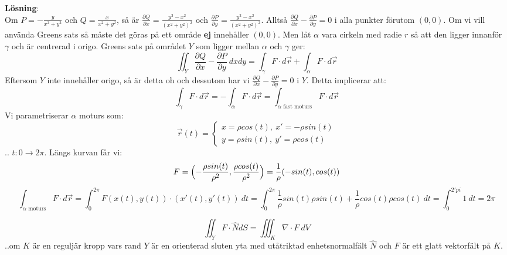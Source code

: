 \documentclass{report}
\begin{document}
\noindent
\textbf{Lösning}:\\
Om $ P = - \frac{y}{x^2+y^2}  $ och $ Q = \frac{x}{x^2+y^2}  $, så är $ \frac{\partial Q }{\partial x } = \frac{y^2-x^2}{( x^2+y^2 )^2}   $ och $ \frac{\partial P }{\partial y }  = \frac{y^2-x^2}{(x^2+y^2)^2}  $. Alltså $ \frac{\partial Q }{\partial x } - \frac{\partial P }{\partial y } = 0 $ i alla punkter förutom $ (0,0) $. Om vi vill använda Greens sats så måste det göras på ett område \textbf{ej} innehåller $ (0,0) $. Men låt $ \alpha $  vara cirkeln med radie $ r $ så att den ligger innanför $ \gamma $ och är centrerad i origo. Greens sats på området $ Y $ som ligger mellan $ \alpha $ och $ \gamma $ ger:
\begin{equation*}
\iint_{Y} \frac{\partial Q }{\partial x } - \frac{\partial P }{\partial y } \: dxdy = \int_{ \gamma}^{} F \cdot  d \vec{r} + \int_{ \alpha}^{} F \cdot d \vec{r}   
\end{equation*}
Eftersom $ Y $ inte innehåller origo, så är detta oh och dessutom har vi $ \frac{\partial Q }{\partial x } - \frac{\partial P }{\partial y } = 0 $ i $ Y $. Detta implicerar att:
\begin{equation*}
\int_{ \gamma}^{} F \cdot  d \vec{r} = - \int_{ \alpha}^{} F \cdot d \vec{r} = \int_{ \alpha \text{ fast moturs} }^{} F \cdot  d \vec{r}   
\end{equation*}
Vi parametriserar $ \alpha $ moturs som:
\begin{equation*}
 \vec{r} (t) = \begin{cases}
	 x = \rho cos(t), \: x' = - \rho sin(t)\\
	 y = \rho sin(t), \: y' = \rho cos(t)
\end{cases}
\end{equation*}
.. $ t : 0 \to 2\pi $. Längs kurvan får vi:
\begin{equation*}
F = \Bigl( - \frac{\rho sin(t)}{\rho^2}, \frac{\rho cos(t)}{\rho^2}  \Bigr) = \frac{1}{\rho} ( -sin(t), cos(t) )
\end{equation*}
\begin{equation*}
\int_{ \alpha \text{ moturs} }^{} F \cdot  d \vec{r} = \int_{0}^{2\pi} F(x(t), y(t)) \cdot (x'(t), y'(t)) \: dt = \int_{0}^{2\pi} \frac{1}{\rho} sin(t) \rho sin(t) + \frac{1}{\rho} cos(t) \rho cos(t) \: dt = \int_{0}^{2'pi} 1 \: dt = 2\pi    
\end{equation*}

\vspace{20pt}
{
\begin{equation*}
	\iint_{Y} F \cdot \hat{N} dS = \iiint_{K} \nabla \cdot F \: dV
\end{equation*}
..om $ K $ är en reguljär kropp vars rand $ Y $ är en orienterad sluten yta med utåtriktad enhetsnormalfält $ \hat{N} $ och $ F $ är ett glatt vektorfält på $ K $. 
}
\end{document}
